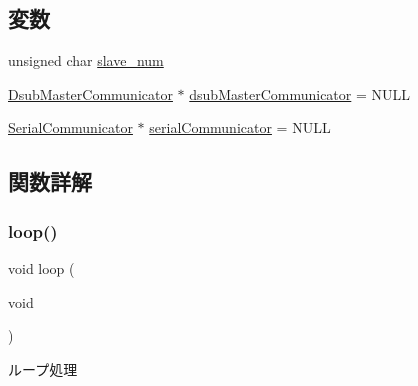 \subsection*{変数}
\begin{DoxyCompactItemize}
\item 
unsigned char \mbox{\hyperlink{start__module_8ino_a74d30eb4a8cad665a32a15dbee48837f}{slave\+\_\+num}}
\item 
\mbox{\hyperlink{class_dsub_master_communicator}{Dsub\+Master\+Communicator}} $\ast$ \mbox{\hyperlink{start__module_8ino_af3e70438e0875f19cc1cb4cb9f522f80}{dsub\+Master\+Communicator}} = N\+U\+LL
\item 
\mbox{\hyperlink{class_serial_communicator}{Serial\+Communicator}} $\ast$ \mbox{\hyperlink{start__module_8ino_a432be7f3eee18ba7ccdf2ab1d8908ae1}{serial\+Communicator}} = N\+U\+LL
\end{DoxyCompactItemize}


\subsection{関数詳解}
\mbox{\label{start__module_8ino_a0b33edabd7f1c4e4a0bf32c67269be2f}} 
\subsubsection{\texorpdfstring{loop()}{loop()}}
{\footnotesize\ttfamily void loop (\begin{DoxyParamCaption}\item[{void}]{ }\end{DoxyParamCaption})}



ループ処理 


